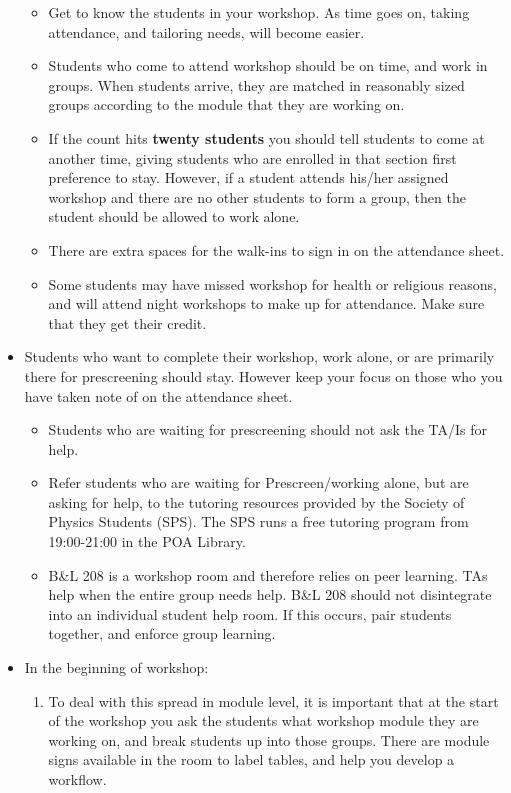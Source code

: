 \documentclass[11pt]{article}
\begin{document}
\begin{itemize}
\begin{itemize}
		\item Get to know the students in your workshop. As time goes on, taking attendance, and tailoring needs, will become easier.
		\item Students who come to attend workshop should be on time, and work in groups. When students arrive, they are matched in reasonably sized groups according to the module that they are working on. 
		\item If the count hits \textbf{twenty students} you should tell students to come at another time, giving students who are enrolled in that section first preference to stay.  However, if a student attends his/her assigned workshop and there are no other students to form a group, then the student should be allowed to work alone.
		\item There are extra spaces for the walk-ins to sign in on the attendance sheet.
		\item Some students may have missed workshop for health or religious reasons, and will attend night workshops to make up for attendance. Make sure that they get their credit. 
	\end{itemize}
	\item Students who want to complete their workshop, work alone, or are primarily there for prescreening should stay. However keep your focus on those who you have taken note of on the attendance sheet.
	\begin{itemize}
		\item Students who are waiting for prescreening should not ask the TA/Is for help.
		\item Refer students who are waiting for Prescreen/working alone, but are asking for help, to the tutoring resources provided by the Society of Physics Students (SPS). The SPS runs a free tutoring program from 19:00-21:00 in the POA Library.  
		\item B\&L 208 is a workshop room and therefore relies on peer learning.  TAs help when the entire group needs help. B\&L 208 should not disintegrate into an individual student help room. If this occurs, pair students together, and enforce group learning.
	\end{itemize}
	\item In the beginning of workshop:
	\begin{enumerate}
		\item To deal with this spread in module level, it is important that at the start of the workshop you ask the students what workshop module they are working on, and break students up into those groups. There are module signs available in the room to label tables, and help you develop a workflow.

\end{enumerate}
\end{itemize}
\end{document}

